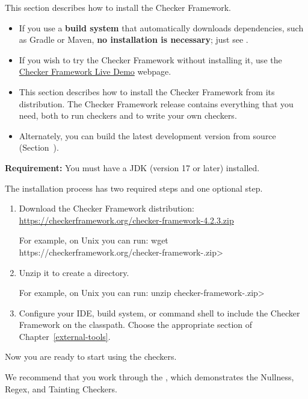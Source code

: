 
This section describes how to install the Checker Framework.
\begin{itemize}
\item
If you use a \textbf{build system} that automatically downloads dependencies,
such as Gradle or Maven, \textbf{no installation is necessary}; just see
.
\item
If you wish to try the Checker Framework without installing it, use the
\href{https://eisop.uwaterloo.ca/live/}{Checker Framework Live Demo} webpage.
\item
This section describes how to install the Checker Framework from its
distribution.  The Checker Framework release contains everything that you
need, both to run checkers and to write your own checkers.
\item
Alternately, you can build the latest development version from source
(Section~).
\end{itemize}


\textbf{Requirement:}
You must have a JDK (version 17 or later) installed.

The installation process has two required steps and one
optional step.
\begin{enumerate}
\item
  Download the Checker Framework distribution:
  \\
  \url{https://checkerframework.org/checker-framework-4.2.3.zip}

  For example, on Unix you can run: \<wget https://checkerframework.org/checker-framework-\ReleaseVersion{}.zip>

\item
  Unzip it to create a  directory.

  For example, on Unix you can run: \<unzip checker-framework-\ReleaseVersion{}.zip>

\item
  \label{installation-configure-step}%
  Configure your IDE, build system, or command shell to include the Checker
  Framework on the classpath.  Choose the appropriate section of
  Chapter~\ref{external-tools}.


\end{enumerate}

Now you are ready to start using the checkers.

We recommend that you work through the
, which demonstrates the Nullness, Regex, and Tainting Checkers.

